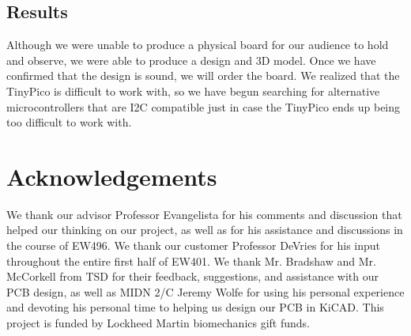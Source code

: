 \documentclass{article}
\begin{document}
\subsection{Results}
 Although we were unable to produce a physical board for our audience to hold and observe, we were able to produce a design and 3D model. Once we have confirmed that the design is sound, we will order the board. We realized that the TinyPico is difficult to work with, so we have begun searching for alternative microcontrollers that are I2C compatible just in case the TinyPico ends up being too difficult to work with.

\section{Acknowledgements}
We thank our advisor Professor Evangelista for his comments and discussion that helped our thinking on our project, as well as for his assistance and discussions in the course of EW496. We thank our customer Professor DeVries for his input throughout the entire first half of EW401. We thank Mr. Bradshaw and Mr. McCorkell from TSD for their feedback, suggestions, and assistance with our PCB design, as well as MIDN 2/C Jeremy Wolfe for using his personal experience and devoting his personal time to helping us design our PCB in KiCAD. This project is funded by Lockheed Martin biomechanics gift funds. 



\end{document}
